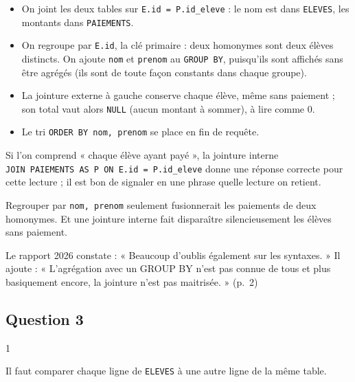 \documentclass[11pt,a4paper]{article}
\providecommand{\tightlist}{\setlength{\itemsep}{0pt}\setlength{\parskip}{0pt}}
\begin{document}
\begin{itemize}
\tightlist
\item
  On joint les deux tables sur \texttt{E.id\ =\allowbreak{}\ P.id\_eleve} : le nom est dans \texttt{ELEVES}, les montants dans \texttt{PAIEMENTS}.
\item
  On regroupe par \texttt{E.id}, la clé primaire : deux homonymes sont deux élèves distincts. On ajoute \texttt{nom} et \texttt{prenom} au \texttt{GROUP\ BY}, puisqu'ils sont affichés sans être agrégés (ils sont de toute façon constants dans chaque groupe).
\item
  La jointure externe à gauche conserve chaque élève, même sans paiement ; son total vaut alors \texttt{NULL} (aucun montant à sommer), à lire comme 0.
\item
  Le tri \texttt{ORDER\ BY\ nom,\allowbreak{}\ prenom} se place en fin de requête.
\end{itemize}

Si l'on comprend « chaque élève ayant payé », la jointure interne \texttt{JOIN\ PAIEMENTS\ AS\ P\ ON\ E.id\ =\allowbreak{}\ P.id\_eleve} donne une réponse correcte pour cette lecture ; il est bon de signaler en une phrase quelle lecture on retient.

\begin{piege}

Regrouper par \texttt{nom,\ prenom} seulement fusionnerait les paiements de deux homonymes. Et une jointure interne fait disparaître silencieusement les élèves sans paiement.

\end{piege}

\begin{jury}

Le rapport 2026 constate : « Beaucoup d'oublis également sur les syntaxes. » Il ajoute : « L'agrégation avec un GROUP BY n'est pas connue de tous et plus basiquement encore, la jointure n'est pas maitrisée. » (p.~2)

\end{jury}

\hypertarget{question-3}{%
\subsection{Question 3}\label{question-3}}

\begin{indication}{1}

Il faut comparer chaque ligne de \texttt{ELEVES} à une autre ligne de la même table.

\end{indication}
\end{document}
